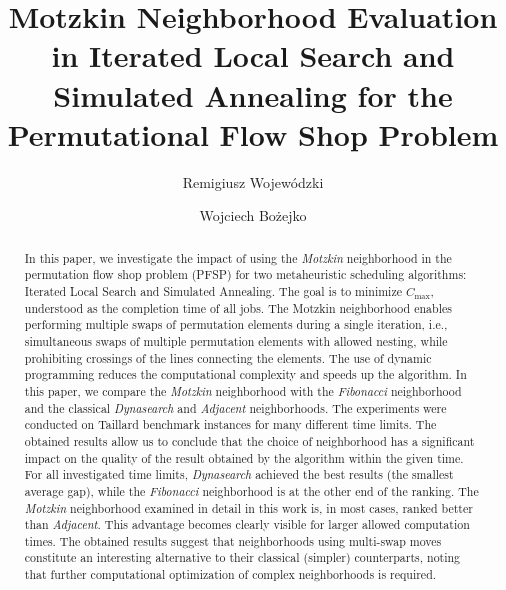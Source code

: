 \documentclass[runningheads]{llncs}
\begin{document}
\title{Motzkin Neighborhood Evaluation in Iterated Local Search
and Simulated Annealing for the Permutational
Flow Shop Problem}



\author{Remigiusz Wojewódzki \and Wojciech Bożejko}

\maketitle           

\begin{abstract}
In this paper, we investigate the impact of using the \emph{Motzkin} neighborhood in the permutation flow shop problem (PFSP) for two metaheuristic scheduling algorithms: Iterated Local Search and Simulated Annealing. The goal is to minimize $C_{\max}$, understood as the completion time of all jobs. The Motzkin neighborhood enables performing multiple swaps of permutation elements during a single iteration, i.e., simultaneous swaps of multiple permutation elements with allowed nesting, while prohibiting crossings of the lines connecting the elements. The use of dynamic programming reduces the computational complexity and speeds up the algorithm. In this paper, we compare the \emph{Motzkin} neighborhood with the \emph{Fibonacci} neighborhood and the classical \emph{Dynasearch} and \emph{Adjacent} neighborhoods. The experiments were conducted on Taillard benchmark instances for many different time limits. The obtained results allow us to conclude that the choice of neighborhood has a significant impact on the quality of the result obtained by the algorithm within the given time. For all investigated time limits, \emph{Dynasearch} achieved the best results (the smallest average gap), while the \emph{Fibonacci} neighborhood is at the other end of the ranking. The \emph{Motzkin} neighborhood examined in detail in this work is, in most cases, ranked better than \emph{Adjacent}. This advantage becomes clearly visible for larger allowed computation times. The obtained results suggest that neighborhoods using multi-swap moves constitute an interesting alternative to their classical (simpler) counterparts, noting that further computational optimization of complex neighborhoods is required.

\end{abstract}
\end{document}
